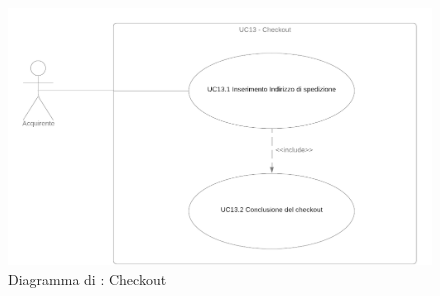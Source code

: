 

\begin{figure}[H]
    \centering
    \includegraphics[scale=0.4]{Immagini/DiagrammiUC/UC13Checkout.png}
    \caption{Diagramma di \actualUC: Checkout} 
    \label{fig:Checkout}
\end{figure}

